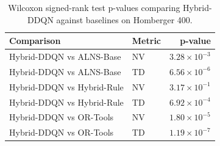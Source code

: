 \begin{table}[htbp]
\centering
\caption{Wilcoxon signed-rank test p-values comparing Hybrid-DDQN against baselines on Homberger 400.}
\label{tab:wilcoxon_homberger_400}
\begin{tabular}{llr}
\hline
\textbf{Comparison} & \textbf{Metric} & \textbf{p-value} \\ \hline
Hybrid-DDQN vs ALNS-Base & NV & $3.28 \times 10^{-3}$ \\
Hybrid-DDQN vs ALNS-Base & TD & $6.56 \times 10^{-6}$ \\
Hybrid-DDQN vs Hybrid-Rule & NV & $3.17 \times 10^{-1}$ \\
Hybrid-DDQN vs Hybrid-Rule & TD & $6.92 \times 10^{-4}$ \\
Hybrid-DDQN vs OR-Tools & NV & $1.80 \times 10^{-5}$ \\
Hybrid-DDQN vs OR-Tools & TD & $1.19 \times 10^{-7}$ \\
\hline
\end{tabular}
\end{table}

